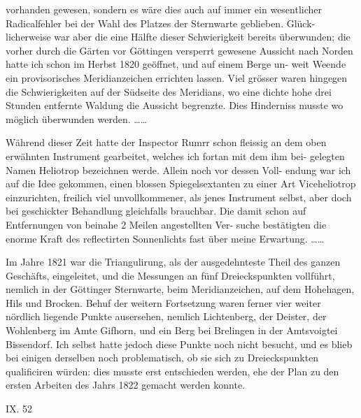 \documentclass[12pt,a4paper]{article}
\theoremstyle{plain}
\theoremstyle{definition}
\theoremstyle{remark}
\begin{document}
\noindent

\noindent

\noindent
vorhanden gewesen, sondern es wäre dies auch auf immer ein wesentlicher
Radicalfehler bei der Wahl des Platzes der Sternwarte geblieben. Glück-
licherweise war aber die eine Hälfte dieser Schwierigkeit bereits überwunden;
die vorher durch die Gärten vor Göttingen versperrt gewesene Aussicht nach
Norden hatte ich schon im Herbst 1820 geöffnet, und auf einem Berge un-
weit Weende ein provisorisches Meridianzeichen errichten lassen. Viel grösser
waren hingegen die Schwierigkeiten auf der Südseite des Meridians, wo eine
dichte hohe drei Stunden entfernte Waldung die Aussicht begrenzte. Dies
Hinderniss musste wo möglich überwunden werden. \ldots\ldots

\noindent
Während dieser Zeit hatte der Inspector Rumrr schon fleissig an dem
oben erwähnten Instrument gearbeitet, welches ich fortan mit dem ihm bei-
gelegten Namen Heliotrop bezeichnen werde. Allein noch vor dessen Voll-
endung war ich auf die Idee gekommen, einen blossen Spiegelsextanten zu
einer Art Viceheliotrop einzurichten, freilich viel unvollkommener, als jenes
Instrument selbst, aber doch bei geschickter Behandlung gleichfalls brauchbar.
Die damit schon auf Entfernungen von beinahe 2 Meilen angestellten Ver-
suche bestätigten die enorme Kraft des reflectirten Sonnenlichts fast über
meine Erwartung. \ldots\ldots


\noindent
Im Jahre 1821 war die Triangulirung, als der ausgedehnteste Theil des
ganzen Geschäfts, eingeleitet, und die Messungen an fünf Dreieckspunkten
vollführt, nemlich in der Göttinger Sternwarte, beim Meridianzeichen, auf dem
Hohehagen, Hils und Brocken. Behuf der weitern Fortsetzung waren ferner
vier weiter nördlich liegende Punkte ausersehen, nemlich Lichtenberg, der
Deister, der Wohlenberg im Amte Gifhorn, und ein Berg bei Brelingen
in der Amtsvoigtei Bissendorf. Ich selbst hatte jedoch diese Punkte noch
nicht besucht, und es blieb bei einigen derselben noch problematisch, ob sie
sich zu Dreieckspunkten qualificiren würden: dies musste erst entschieden
werden, ehe der Plan zu den ersten Arbeiten des Jahrs 1822 gemacht werden
konnte.

\noindent
IX. 52

\noindent
\end{document}
